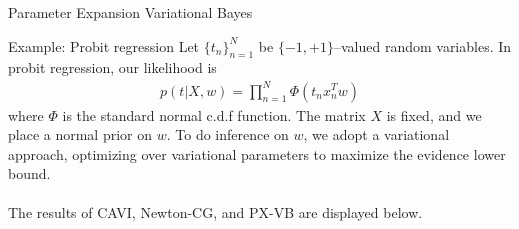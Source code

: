 \documentclass[final]{beamer}
\newlength{\twocolwid}
\begin{document}
\begin{frame}[t]
\begin{columns}[t]
\begin{column}{\twocolwid}


\begin{block}{Parameter Expansion Variational Bayes}

\end{block}


\begin{block}{Example: Probit regression}
Let $\{t_n\}_{n=1}^N$ be $\{-1,+1\}$--valued random variables. In probit regression, our likelihood is
\begin{align*}
p(t | X, w) = \prod_{n=1}^N \Phi(t_nx_n^Tw)
\end{align*}
where $\Phi$ is the standard normal c.d.f function. The matrix $X$ is fixed, and we place a normal prior on $w$. To do inference on $w$, we adopt a variational approach, optimizing over variational parameters to maximize the evidence lower bound. \\~\\

The results of CAVI, Newton-CG, and PX-VB are displayed below.   



\end{block}
\end{column}
\end{columns}
\end{frame}
\end{document}
